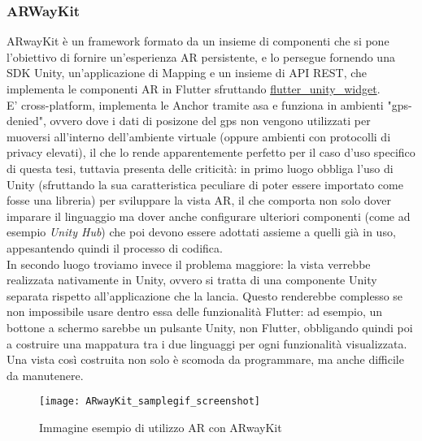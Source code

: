 \subsubsection{ARWayKit}
ARwayKit è un framework formato da un insieme di componenti che si pone l'obiettivo di fornire un'esperienza AR persistente, e lo persegue fornendo una SDK Unity, un'applicazione di Mapping e un insieme di API REST, che implementa le componenti AR in Flutter sfruttando \href{https://pub.dev/packages/flutter_unity_widget}{flutter\_unity\_widget}.\\
E' cross-platform, implementa le Anchor tramite asa e funziona in ambienti "gps-denied", ovvero dove i dati di posizone del gps non vengono utilizzati per muoversi all'interno dell'ambiente virtuale (oppure ambienti con protocolli di privacy elevati), il che lo rende apparentemente perfetto per il caso d'uso specifico di questa tesi, tuttavia presenta delle criticità: in primo luogo obbliga l'uso di Unity (sfruttando la sua caratteristica peculiare di poter essere importato come fosse una libreria) per sviluppare la vista AR, il che comporta non solo dover imparare il linguaggio ma dover anche configurare ulteriori componenti (come ad esempio \textit{Unity Hub}) che poi devono essere adottati assieme a quelli già in uso, appesantendo quindi il processo di codifica.\\
In secondo luogo troviamo invece il problema maggiore: la vista verrebbe realizzata nativamente in Unity, ovvero si tratta di una componente Unity separata rispetto all'applicazione che la lancia.
Questo renderebbe complesso se non impossibile usare dentro essa delle funzionalità Flutter: ad esempio, un bottone a schermo sarebbe un pulsante Unity, non Flutter, obbligando quindi poi a costruire una mappatura tra i due linguaggi per ogni funzionalità visualizzata.\\ 
Una vista così costruita non solo è scomoda da programmare, ma anche difficile da manutenere.\\

\begin{figure}[h!]
    \centering
    \texttt{[image: ARwayKit\_samplegif\_screenshot]}
    \caption{Immagine esempio di utilizzo AR con ARwayKit}
\end{figure}


